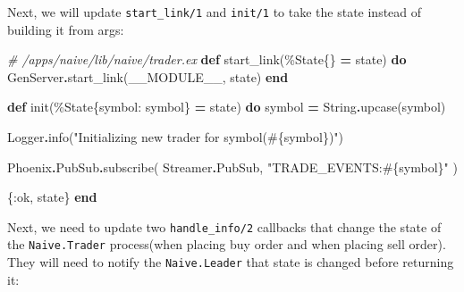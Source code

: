 \documentclass[
  oneside]{book}
\newenvironment{Shaded}{\begin{snugshade}}{\end{snugshade}}
\newcommand{\CommentTok}[1]{\textcolor[rgb]{0.56,0.35,0.01}{\textit{#1}}}
\newcommand{\ConstantTok}[1]{\textcolor[rgb]{0.00,0.00,0.00}{#1}}
\newcommand{\KeywordTok}[1]{\textcolor[rgb]{0.13,0.29,0.53}{\textbf{#1}}}
\newcommand{\NormalTok}[1]{#1}
\newcommand{\OperatorTok}[1]{\textcolor[rgb]{0.81,0.36,0.00}{\textbf{#1}}}
\newcommand{\OtherTok}[1]{\textcolor[rgb]{0.56,0.35,0.01}{#1}}
\newcommand{\StringTok}[1]{\textcolor[rgb]{0.31,0.60,0.02}{#1}}
\newcommand{\VariableTok}[1]{\textcolor[rgb]{0.00,0.00,0.00}{#1}}
\begin{document}
Next, we will update \texttt{start\_link/1} and \texttt{init/1} to take the state instead of building it from args:

\begin{Shaded}
\begin{Highlighting}[]
  \CommentTok{\# /apps/naive/lib/naive/trader.ex}
  \KeywordTok{def}\NormalTok{ start\_link(\%}\ConstantTok{State}\NormalTok{\{\} }\OperatorTok{=}\NormalTok{ state) }\KeywordTok{do}
    \ConstantTok{GenServer}\OperatorTok{.}\NormalTok{start\_link(}\ConstantTok{\_\_MODULE\_\_}\NormalTok{, state)}
  \KeywordTok{end}

  \KeywordTok{def}\NormalTok{ init(\%}\ConstantTok{State}\NormalTok{\{}\VariableTok{symbol:}\NormalTok{ symbol\} }\OperatorTok{=}\NormalTok{ state) }\KeywordTok{do}
\NormalTok{    symbol }\OperatorTok{=} \ConstantTok{String}\OperatorTok{.}\NormalTok{upcase(symbol)}

    \ConstantTok{Logger}\OperatorTok{.}\NormalTok{info(}\StringTok{"Initializing new trader for symbol(}\OtherTok{\#\{}\NormalTok{symbol}\OtherTok{\}}\StringTok{)"}\NormalTok{)}

    \ConstantTok{Phoenix}\OperatorTok{.}\ConstantTok{PubSub}\OperatorTok{.}\NormalTok{subscribe(}
      \ConstantTok{Streamer}\OperatorTok{.}\ConstantTok{PubSub}\NormalTok{,}
      \StringTok{"TRADE\_EVENTS:}\OtherTok{\#\{}\NormalTok{symbol}\OtherTok{\}}\StringTok{"}
\NormalTok{    )}

\NormalTok{    \{}\VariableTok{:ok}\NormalTok{, state\}}
  \KeywordTok{end}
\end{Highlighting}
\end{Shaded}

Next, we need to update two \texttt{handle\_info/2} callbacks that change the state of the \texttt{Naive.Trader} process(when placing buy order and when placing sell order). They will need to notify the \texttt{Naive.Leader} that state is changed before returning it:
\end{document}
